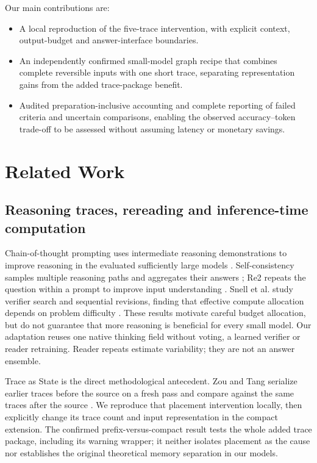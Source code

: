 Our main contributions are:
\begin{itemize}
\item A local reproduction of the five-trace intervention, with explicit context, output-budget and answer-interface boundaries.
\item An independently confirmed small-model graph recipe that combines complete reversible inputs with one short trace, separating representation gains from the added trace-package benefit.
\item Audited preparation-inclusive accounting and complete reporting of failed criteria and uncertain comparisons, enabling the observed accuracy--token trade-off to be assessed without assuming latency or monetary savings.
\end{itemize}

\section{Related Work}
\label{sec:related-work}
\subsection{Reasoning traces, rereading and inference-time computation}
Chain-of-thought prompting uses intermediate reasoning demonstrations to improve reasoning in the evaluated sufficiently large models \citep{wei2022cot}. Self-consistency samples multiple reasoning paths and aggregates their answers \citep{wang2023selfconsistency}; Re2 repeats the question within a prompt to improve input understanding \citep{xu2024rereading}. Snell et al. study verifier search and sequential revisions, finding that effective compute allocation depends on problem difficulty \citep{snell2025testtime}. These results motivate careful budget allocation, but do not guarantee that more reasoning is beneficial for every small model. Our adaptation reuses one native thinking field without voting, a learned verifier or reader retraining. Reader repeats estimate variability; they are not an answer ensemble.

Trace as State is the direct methodological antecedent. Zou and Tang serialize earlier traces before the source on a fresh pass and compare against the same traces after the source \citep{tang2026trace}. We reproduce that placement intervention locally, then explicitly change its trace count and input representation in the compact extension. The confirmed prefix-versus-compact result tests the whole added trace package, including its warning wrapper; it neither isolates placement as the cause nor establishes the original theoretical memory separation in our models.

